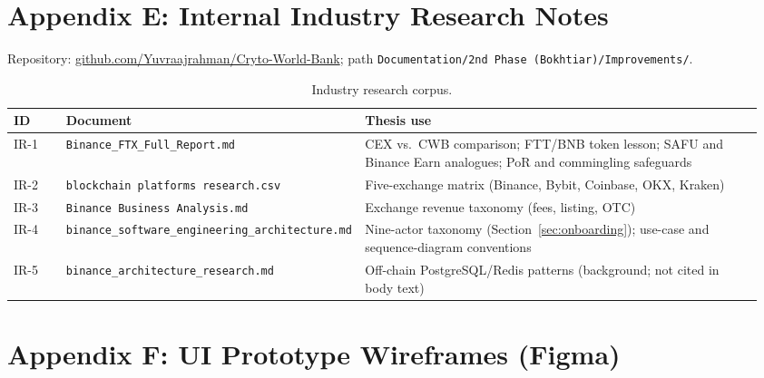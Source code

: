 \documentclass[12pt,a4paper]{report}
\newcommand{\tableheadcolor}{\rowcolor{TableHeadBg}}
\begin{document}
\chapter*{Appendix E: Internal Industry Research Notes}
{}
\label{app:internal-research}

\noindent Repository: \href{https://github.com/Yuvraajrahman/Cryto-World-Bank}{github.com/Yuvraajrahman/Cryto-World-Bank}; path \texttt{Documentation/2nd Phase (Bokhtiar)/Improvements/}.

\begin{table}[H]
\centering
\caption[Industry research corpus]{Industry research corpus.}
\label{tab:internal-research}
\begingroup
\footnotesize
\setlength{\tabcolsep}{4pt}
\renewcommand{\arraystretch}{1.15}
\begin{tabular}{@{}%
  >{\raggedright\arraybackslash}p{0.07\linewidth}%
  >{\raggedright\arraybackslash}p{0.36\linewidth}%
  >{\raggedright\arraybackslash}p{0.53\linewidth}@{}}
\toprule
\tableheadcolor
\textbf{ID} & \textbf{Document} & \textbf{Thesis use} \\
\midrule
IR-1 & \texttt{Binance\_FTX\_Full\_Report.md} & CEX vs.\ CWB comparison; FTT/BNB token lesson; SAFU and Binance Earn analogues; PoR and commingling safeguards \\
IR-2 & \texttt{blockchain platforms research.csv} & Five-exchange matrix (Binance, Bybit, Coinbase, OKX, Kraken) \\
IR-3 & \texttt{Binance Business Analysis.md} & Exchange revenue taxonomy (fees, listing, OTC) \\
IR-4 & \texttt{binance\_software\_engineering\_architecture.md} & Nine-actor taxonomy (Section~\ref{sec:onboarding}); use-case and sequence-diagram conventions \\
IR-5 & \texttt{binance\_architecture\_research.md} & Off-chain PostgreSQL/Redis patterns (background; not cited in body text) \\
\bottomrule
\end{tabular}
\endgroup
\end{table}

\chapter*{Appendix F: UI Prototype Wireframes (Figma)}
{}
\label{app:ui-prototypes}
\end{document}
